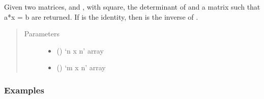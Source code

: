 \documentclass[letterpaper,10pt,english]{sphinxmanual}
\begin{document}
\begin{fulllineitems}
\label{\detokenize{index:acse_la.gauss}}
Given two matrices,  and , with  square, the determinant
of  and a matrix  such that a*x = b are returned.
If  is the identity, then  is the inverse of .
\begin{quote}\begin{description}
\item[{Parameters}] \leavevmode\begin{itemize}
\item {} 
 () \textendash{} ‘n x n’ array

\item {} 
 () \textendash{} ‘m x n’ array

\end{itemize}

\end{description}\end{quote}
\subsubsection*{Examples}


\end{fulllineitems}
\end{document}
